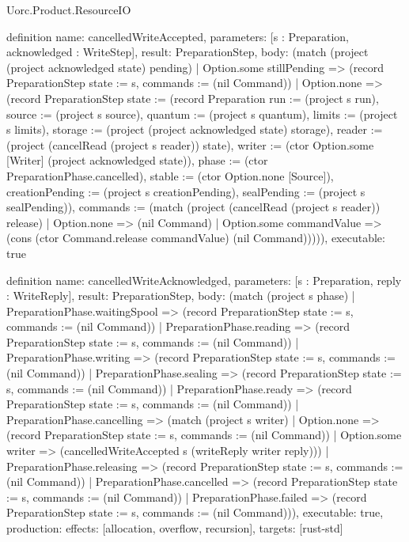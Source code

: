 \begin{lexlean}{Uorc.Product.ResourceIO}
\begin{semanticmodule}
definition{
  name: cancelledWriteAccepted,
  parameters: [s : Preparation, acknowledged : WriteStep],
  result: PreparationStep,
  body: (match (project (project acknowledged state) pending)
    | Option.some stillPending => (record PreparationStep {state := s, commands := (nil Command)})
    | Option.none => (record PreparationStep {state := (record Preparation {run := (project s run), source := (project s source), quantum := (project s quantum), limits := (project s limits), storage := (project (project acknowledged state) storage), reader := (project (cancelRead (project s reader)) state), writer := (ctor Option.some [Writer] (project acknowledged state)), phase := (ctor PreparationPhase.cancelled), stable := (ctor Option.none [Source]), creationPending := (project s creationPending), sealPending := (project s sealPending)}), commands := (match (project (cancelRead (project s reader)) release)
      | Option.none => (nil Command)
      | Option.some commandValue => (cons (ctor Command.release commandValue) (nil Command)))})),
  executable: true
}

definition{
  name: cancelledWriteAcknowledged,
  parameters: [s : Preparation, reply : WriteReply],
  result: PreparationStep,
  body: (match (project s phase)
    | PreparationPhase.waitingSpool => (record PreparationStep {state := s, commands := (nil Command)})
    | PreparationPhase.reading => (record PreparationStep {state := s, commands := (nil Command)})
    | PreparationPhase.writing => (record PreparationStep {state := s, commands := (nil Command)})
    | PreparationPhase.sealing => (record PreparationStep {state := s, commands := (nil Command)})
    | PreparationPhase.ready => (record PreparationStep {state := s, commands := (nil Command)})
    | PreparationPhase.cancelling => (match (project s writer)
      | Option.none => (record PreparationStep {state := s, commands := (nil Command)})
      | Option.some writer => (cancelledWriteAccepted s (writeReply writer reply)))
    | PreparationPhase.releasing => (record PreparationStep {state := s, commands := (nil Command)})
    | PreparationPhase.cancelled => (record PreparationStep {state := s, commands := (nil Command)})
    | PreparationPhase.failed => (record PreparationStep {state := s, commands := (nil Command)})),
  executable: true,
  production: {effects: [allocation, overflow, recursion], targets: [rust-std]}
}


\end{semanticmodule}
\end{lexlean}
